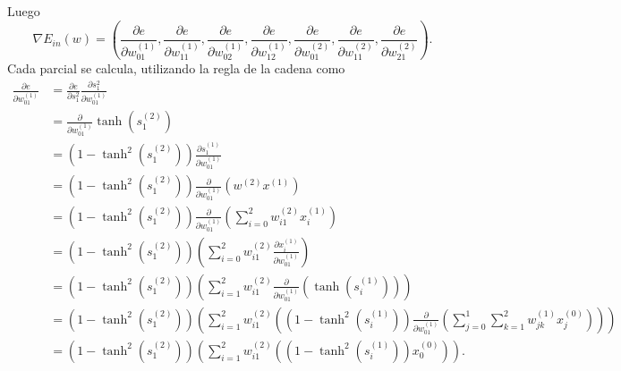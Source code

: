Luego 
\begin{equation}
    \nabla E_{in}(w) = 
    \left(
        \frac{\partial e}{\partial w^{(1)}_{01}},
        \frac{\partial e}{\partial w^{(1)}_{11}},
        \frac{\partial e}{\partial w^{(1)}_{02}},
        \frac{\partial e}{\partial w^{(1)}_{12}},
        \frac{\partial e}{\partial w^{(2)}_{01}},
        \frac{\partial e}{\partial w^{(2)}_{11}},
        \frac{\partial e}{\partial w^{(2)}_{21}}
    \right).
\end{equation} 
Cada parcial se calcula, utilizando la regla de la cadena como
\begin{align}
    \frac{\partial e}{\partial w^{(1)}_{01}} 
    &=
    \frac{\partial e}{\partial s_1^{2}}
    \frac{\partial s_1^{2}}{\partial w^{(1)}_{01}} 
    \\
    &= 
    \frac{\partial }{\partial w^{(1)}_{01}}
         \tanh \left(s^{(2)}_{1}\right)
    \\
    &= 
    \left(1- \tanh^2 \left(s^{(2)}_{1}\right)\right) 
    \frac{\partial s^{(1)}_{1}}{\partial w^{(1)}_{01}}
    \\
    &= 
    \left(1- \tanh^2 \left(s^{(2)}_{1}\right)\right) 
    \frac{\partial }{\partial w^{(1)}_{01}}
    \left(w^{(2)}x^{(1)}\right)
    \\
    &= 
    \left(1- \tanh^2 \left(s^{(2)}_{1}\right)\right) 
    \frac{\partial }{\partial w^{(1)}_{01}}
    \left(
        \sum^2_{i=0}
        w^{(2)}_{i1}x^{(1)}_i
    \right)
    \\
    &= 
    \left(1- \tanh^2 \left(s^{(2)}_{1}\right)\right) 
    \left(
        \sum^2_{i=0}
        w^{(2)}_{i1}\frac{\partial x^{(1)}_i }{\partial w^{(1)}_{01}}
    \right)
    \\
    &= 
    \left(1- \tanh^2 \left(s^{(2)}_{1}\right)\right) 
    \left(
        \sum^2_{i=1}
        w^{(2)}_{i1}\frac{\partial }{\partial w^{(1)}_{01}}
        \left(
            \tanh \left(s^{(1)}_{i}\right)
        \right)
    \right)
    \\
    &= 
    \left(1- \tanh^2 \left(s^{(2)}_{1}\right)\right) 
    \left(
        \sum^2_{i=1}
        w^{(2)}_{i1}
        \left(
            \left(1- \tanh^2 \left(s^{(1)}_{i}\right)\right)
            \frac{\partial  }{\partial w^{(1)}_{01}}
            \left(
                \sum^1_{j=0}\sum^2_{k=1}
                w^{(1)}_{jk}x^{(0)}_j
            \right)
        \right)
    \right)
    \\
    &= 
    \left(1- \tanh^2 \left(s^{(2)}_{1}\right)\right) 
    \left(
        \sum^2_{i=1}
        w^{(2)}_{i1}
        \left(
            \left(1- \tanh^2 \left(s^{(1)}_{i}\right)\right)
            x^{(0)}_0
        \right)
    \right).
\end{align}
